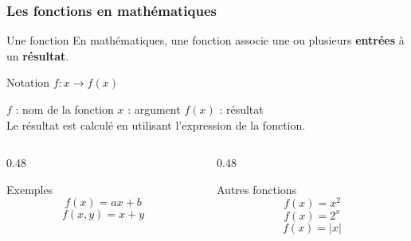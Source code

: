 \documentclass[10pt]{beamer}
\begin{document}
\begin{frame}
	\frametitle{Les fonctions en mathématiques}
	
	\begin{block}{Une fonction}
		En mathématiques, une fonction associe une ou plusieurs
		\textbf{entrées} à un \textbf{résultat}.
	\end{block}
	
	\vspace{0.15cm}
	
	\begin{exampleblock}{Notation}
		\centering
		$f : x \rightarrow f(x)$
		
		\vspace{0.1cm}
		
		\textbf{$f$} : nom de la fonction
		\qquad
		\textbf{$x$} : argument
		\qquad
		\textbf{$f(x)$} : résultat\\
		Le résultat est calculé en utilisant l'expression de la fonction. 
		
	\end{exampleblock}
	
	\vspace{0.15cm}
	
	\begin{columns}[T]
		\begin{column}{0.48\textwidth}
			\begin{exampleblock}{Exemples}
				\[
				f(x) = ax + b
				\]
				\[
				f(x,y) = x+y
				\]
			\end{exampleblock}
		\end{column}
		
		\begin{column}{0.48\textwidth}
			\begin{exampleblock}{Autres fonctions}
				\[
				f(x) = x^2
				\]
				\[
				f(x) = 2^x
				\]
				\[
				f(x) = |x|
				\]
			\end{exampleblock}
		\end{column}
	\end{columns}
	
\end{frame}
\end{document}
